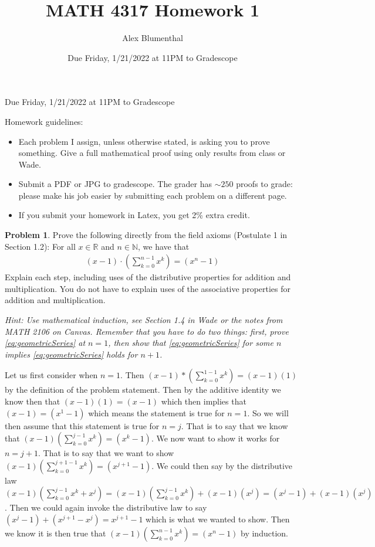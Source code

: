 \documentclass[11pt]{article}
\title{MATH 4317 Homework 1}
\author{Alex Blumenthal}
\date{Due Friday, 1/21/2022 at 11PM to Gradescope}
\theoremstyle{definition}
\newtheorem{problem}{Problem}
\newcommand{\N}{\mathbb{N}}
\newcommand{\R}{\mathbb{R}}
\begin{document}
  \hfill Due Friday, 1/21/2022 at 11PM to Gradescope

\bigskip

\noindent Homework guidelines: 
\begin{itemize}
\item Each problem I assign, unless otherwise stated, is asking you to prove something. Give a full mathematical proof using only results from class or Wade.
\item Submit a PDF or JPG to gradescope. The grader has $\sim 250$ proofs to grade:  please make his job easier by submitting each problem on a different page. 
\item If you submit your homework in Latex, you get 2\% extra credit. 
\end{itemize}

\begin{problem}
Prove the following directly from the field axioms (Postulate 1 in Section 1.2): For all $x \in \R$ and $n \in \N$, we have that
\begin{align}\label{eq:geometricSeries}
(x - 1) \cdot \left(  \sum_{k = 0}^{n-1} x^k \right) = (x^n - 1)
\end{align}
Explain each step, including uses of the distributive properties for addition and multiplication. You do not have to explain uses of the associative properties for addition and multiplication. 

\emph{Hint: Use mathematical induction, see Section 1.4 in Wade or the notes from MATH 2106 on Canvas. Remember that you have to do two things: first, prove \eqref{eq:geometricSeries} at $n = 1$, then show that \eqref{eq:geometricSeries} for some $n$ implies \eqref{eq:geometricSeries} holds for $n + 1$. }
\end{problem}

Let us first consider when $n=1.$ Then $(x-1)*(\sum_{k=0}^{1-1}x^k) = (x-1)(1)$ by the definition of the problem statement. Then by the additive identity we know then that $(x-1)(1) = (x-1)$ which then implies that $(x-1) = (x^1-1)$ which means the statement is true for $n=1.$ So we will then assume that this statement is true for $n=j.$ That is to say that we know that $(x-1)(\sum_{k=0}^{j-1}x^k) = (x^k-1).$ We now want to show it works for $n=j+1$. That is to say that we want to show $(x-1)(\sum_{k=0}^{j+1-1}x^k) = (x^{j+1}-1)$. We could then say by the distributive law $(x-1)(\sum_{k=0}^{j-1}x^k+x^j) = (x-1)(\sum_{k=0}^{j-1}x^k)+(x-1)(x^j) = (x^j-1)+(x-1)(x^j)$. Then we could again invoke the distributive law to say $(x^j-1)+(x^{j+1}-x^j) = x^{j+1}-1$ which is what we wanted to show. Then we know it is then true that $(x-1)(\sum_{k=0}^{n-1}x^k) = (x^n-1)$ by induction.
\end{document}
